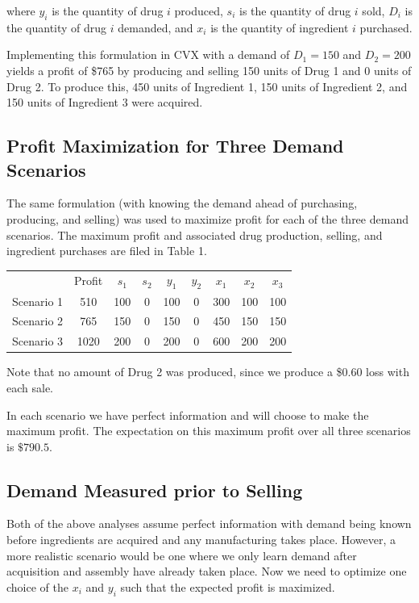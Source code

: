 \documentclass[a4paper]{article}
\begin{document}
where $y_i$ is the quantity of drug $i$ produced, $s_i$ is the quantity of drug $i$ sold, $D_i$ is the quantity of drug $i$ demanded, and $x_i$ is the quantity of ingredient $i$ purchased.

Implementing this formulation in CVX with a demand of $D_1 = 150$ and $D_2 = 200$ yields a profit of \$765 by producing and selling 150 units of Drug 1 and 0 units of Drug 2. To produce this, 450 units of Ingredient 1, 150 units of Ingredient 2, and 150 units of Ingredient 3 were acquired.

\subsection{Profit Maximization for Three Demand Scenarios}
The same formulation (with knowing the demand ahead of purchasing, producing, and selling) was used to maximize profit for each of the three demand scenarios. The maximum profit and associated drug production, selling, and ingredient purchases are filed in Table 1.

\begin{tabular}{c  c  c c  c c c c c}
           & Profit & $s_1$ & $s_2$ & $y_1$ & $y_2$ & $x_1$ & $x_2$ & $x_3$ \\
Scenario 1 &  510   & 100   & 0     & 100   & 0     & 300   & 100   & 100   \\
Scenario 2 &  765   & 150   & 0     & 150   & 0     & 450   & 150   & 150   \\
Scenario 3 & 1020   & 200   & 0     & 200   & 0     & 600   & 200   & 200   \\
\end{tabular}

Note that no amount of Drug 2 was produced, since we produce a \$0.60 loss with each sale.

In each scenario we have perfect information and will choose to make the maximum profit.
The expectation on this maximum profit over all three scenarios is $ \$790.5$.

\subsection{Demand Measured prior to Selling}
Both of the above analyses assume perfect information with demand being known before ingredients are acquired and any manufacturing takes place.
However, a more realistic scenario would be one where we only learn demand after acquisition and assembly have already taken place.
Now we need to optimize one choice of the $x_i$ and $y_i$ such that the expected profit is maximized.
\end{document}

